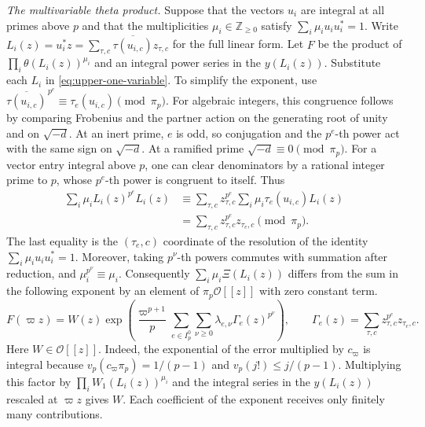 \emph{The multivariable theta product.}
Suppose that the vectors \(u_i\) are integral at all primes above \(p\)
and that the multiplicities \(\mu_i\in\mathbb Z_{\ge0}\) satisfy
\(\sum_i\mu_i u_i u_i^\ast=1\).
Write \(L_i(z)=u_i^\ast z=\sum_{\tau,c}\overline{\tau(u_{i,c})}z_{\tau,c}\)
for the full linear form. Let \(F\) be the product of
\(\prod_i\theta(L_i(z))^{\mu_i}\) and an integral power series in
the \(y(L_i(z))\). Substitute each \(L_i\) in \eqref{eq:upper-one-variable}.
To simplify the exponent, use
\(\overline{\tau(u_{i,c})}^{\,p^e}\equiv\tau_e(u_{i,c})\pmod{\pi_p}\).
For algebraic integers, this congruence follows by comparing Frobenius
and the partner action on the generating root of unity and on
\(\sqrt{-d}\). At an inert prime, \(e\) is odd, so conjugation and the
\(p^e\)-th power act with the same sign on \(\sqrt{-d}\).
At a ramified prime \(\sqrt{-d}\equiv0\pmod{\pi_p}\).
For a vector entry integral above \(p\), one can clear denominators by a
rational integer prime to \(p\), whose \(p^e\)-th power is congruent to
itself. Thus
\[
 \begin{aligned}
 \sum_i\mu_i L_i(z)^{p^e}L_i(z)
 &\equiv \sum_{\tau,c}z_{\tau,c}^{p^e}
              \sum_i\mu_i\tau_e(u_{i,c}) L_i(z)\\
 &=\sum_{\tau,c} z_{\tau,c}^{p^e}z_{\tau_e,c}\pmod{\pi_p}.
 \end{aligned}
\]
The last equality is the \((\tau_e,c)\) coordinate of the resolution
of the identity \(\sum_i\mu_i u_i u_i^\ast=1\).
Moreover, taking \(p^\nu\)-th powers commutes with summation after
reduction, and \(\mu_i^{p^\nu}\equiv\mu_i\).
Consequently \(\sum_i\mu_i\Xi(L_i(z))\) differs from the sum in the
following exponent by an element of \(\pi_p\mathcal O[[z]]\) with zero
constant term.
\begin{equation}\label{eq:upper-normal}
 F(\varpi z)=W(z)\exp\!\left(
       \frac{\varpi^{p+1}}{p}
       \sum_{e\in I_p^0}\sum_{\nu\ge0}\lambda_{e,\nu}\Gamma_e(z)^{p^\nu}
                              \right),
 \qquad
 \Gamma_e(z)=\sum_{\tau,c}z_{\tau,c}^{p^e}z_{\tau_e,c}.
\end{equation}
Here \(W\in\mathcal O[[z]]\). Indeed, the exponential of the error
multiplied by \(c_\varpi\) is integral because
\(v_p(c_\varpi\pi_p)=1/(p-1)\) and \(v_p(j!)\le j/(p-1)\).
Multiplying this factor by \(\prod_i W_1(L_i(z))^{\mu_i}\)
and the integral series in the \(y(L_i(z))\) rescaled at \(\varpi z\)
gives \(W\). Each coefficient of the exponent receives only finitely
many contributions.


